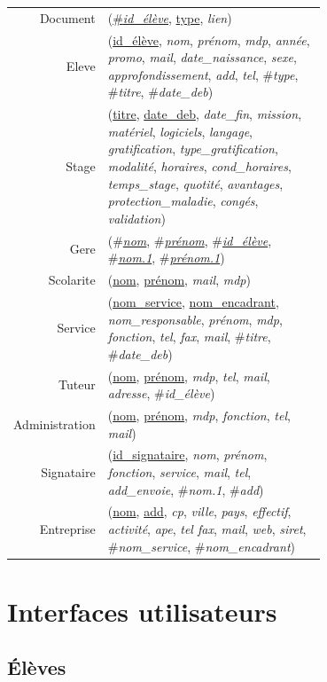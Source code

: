\documentclass{scrreprt}
\newenvironment{mld}
  {\par\begin{minipage}{\linewidth}\begin{tabular}{rp{0.7\linewidth}}}
  {\end{tabular}\end{minipage}\par}
\newcommand{\attr}[1]{\emph{#1}}
\newcommand{\prim}[1]{\uline{#1}}
\newcommand{\foreign}[1]{\#\textsl{#1}}
\begin{document}
\begin{mld}
  Document & (\prim{\foreign{id\_élève}}, \prim{type}, \attr{lien})\\
  Eleve & (\prim{id\_élève}, \attr{nom}, \attr{prénom}, \attr{mdp}, \attr{année}, \attr{promo}, \attr{mail}, \attr{date\_naissance}, \attr{sexe}, \attr{approfondissement}, \attr{add}, \attr{tel}, \foreign{type}, \foreign{titre}, \foreign{date\_deb})\\
  Stage & (\prim{titre}, \prim{date\_deb}, \attr{date\_fin}, \attr{mission}, \attr{matériel}, \attr{logiciels}, \attr{langage}, \attr{gratification}, \attr{type\_gratification}, \attr{modalité}, \attr{horaires}, \attr{cond\_horaires}, \attr{temps\_stage}, \attr{quotité}, \attr{avantages}, \attr{protection\_maladie}, \attr{congés}, \attr{validation})\\
  Gere & (\foreign{\prim{nom}}, \foreign{\prim{prénom}}, \foreign{\prim{id\_élève}}, \foreign{\prim{nom.1}}, \foreign{\prim{prénom.1}})\\
  Scolarite & (\prim{nom}, \prim{prénom}, \attr{mail}, \attr{mdp})\\
  Service & (\prim{nom\_service}, \prim{nom\_encadrant}, \attr{nom\_responsable}, \attr{prénom}, \attr{mdp}, \attr{fonction}, \attr{tel}, \attr{fax}, \attr{mail}, \foreign{titre}, \foreign{date\_deb})\\
  Tuteur & (\prim{nom}, \prim{prénom}, \attr{mdp}, \attr{tel}, \attr{mail}, \attr{adresse}, \foreign{id\_élève})\\
  Administration & (\prim{nom}, \prim{prénom}, \attr{mdp}, \attr{fonction}, \attr{tel}, \attr{mail})\\
  Signataire & (\prim{id\_signataire}, \attr{nom}, \attr{prénom}, \attr{fonction}, \attr{service}, \attr{mail}, \attr{tel}, \attr{add\_envoie}, \foreign{nom.1}, \foreign{add})\\
  Entreprise & (\prim{nom}, \prim{add}, \attr{cp}, \attr{ville}, \attr{pays}, \attr{effectif}, \attr{activité}, \attr{ape}, \attr{tel fax}, \attr{mail}, \attr{web}, \attr{siret}, \foreign{nom\_service}, \foreign{nom\_encadrant})\\
\end{mld}

\newpage
\section{Interfaces utilisateurs}

\subsection{\'El\`eves}
\centering
\end{document}
